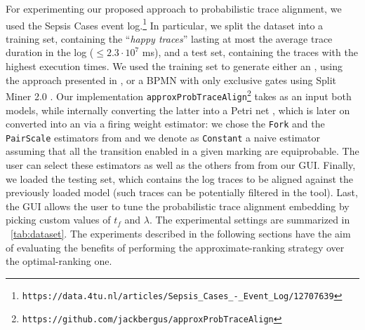 For experimenting our proposed approach to probabilistic trace alignment, we used the Sepsis Cases event log.\footnote{{\small \texttt{https://data.4tu.nl/articles/Sepsis\_Cases\_-\_Event\_Log/12707639}}} In particular, we
split the dataset into a training set, containing the ``\textit{happy traces}''  lasting at most the average trace duration in the log
($\leq 2.3\cdot 10^{7}$ ms), and a test set, containing the traces with the highest execution times. We used the training set to generate either an \uswn, using the approach presented in \cite{RoggeSoltiAW13}, or a BPMN with only exclusive gates using Split Miner 2.0 \cite{AugustoCDRP19}. Our implementation \texttt{approxProbTraceAlign}\footnote{\texttt{https://github.com/jackbergus/approxProbTraceAlign}} takes as an input both models, while internally converting the latter into a Petri net \cite{PPNFromLog}, which is later on converted into an \uswn via a firing weight estimator: we chose the \texttt{Fork} and the \texttt{PairScale} estimators from \cite{spdwe} and we denote as \texttt{Constant} a naive estimator assuming that all the transition enabled in a given marking are equiprobable. The user can select these estimators as well as the others from \cite{spdwe} from our GUI. 
Finally, we loaded the testing set, which contains the log traces to be aligned against the previously loaded model (such traces can be potentially filtered in the tool). 
Last, the GUI allows the user to tune the probabilistic trace alignment embedding by picking custom values of $t_f$ and $\lambda$.
The experimental settings are summarized in \tablename~\ref{tab:dataset}. The experiments described in the following sections have the aim of evaluating the benefits of performing the approximate-ranking strategy over the optimal-ranking one.

